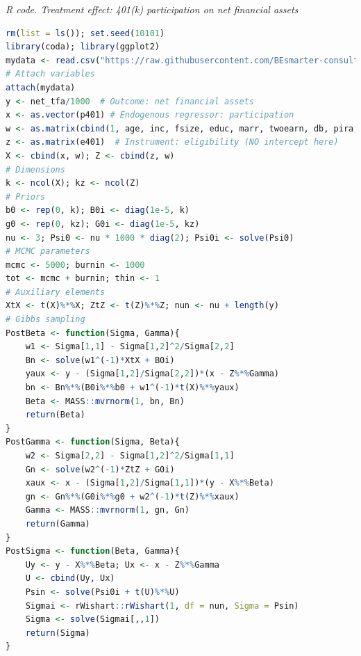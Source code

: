 \begin{tcolorbox}[enhanced,width=4.67in,center upper,
	fontupper=\large\bfseries,drop shadow southwest,sharp corners]\label{code3n_chap12}
	\textit{R code. Treatment effect: 401(k) participation on net financial assets}
	\begin{VF}
		\begin{lstlisting}[language=R]		
rm(list = ls()); set.seed(10101)
library(coda); library(ggplot2)
mydata <- read.csv("https://raw.githubusercontent.com/BEsmarter-consultancy/BSTApp/refs/heads/master/DataApp/401k.csv", sep = ",", header = TRUE, quote = "")
# Attach variables
attach(mydata)
y <- net_tfa/1000  # Outcome: net financial assets
x <- as.vector(p401) # Endogenous regressor: participation
w <- as.matrix(cbind(1, age, inc, fsize, educ, marr, twoearn, db, pira, hown))  # Exogenous regressors with intercept
z <- as.matrix(e401)  # Instrument: eligibility (NO intercept here)
X <- cbind(x, w); Z <- cbind(z, w)
# Dimensions
k <- ncol(X); kz <- ncol(Z)  
# Priors
b0 <- rep(0, k); B0i <- diag(1e-5, k)
g0 <- rep(0, kz); G0i <- diag(1e-5, kz)
nu <- 3; Psi0 <- nu * 1000 * diag(2); Psi0i <- solve(Psi0)
# MCMC parameters
mcmc <- 5000; burnin <- 1000
tot <- mcmc + burnin; thin <- 1
# Auxiliary elements
XtX <- t(X)%*%X; ZtZ <- t(Z)%*%Z; nun <- nu + length(y)
# Gibbs sampling
PostBeta <- function(Sigma, Gamma){
	w1 <- Sigma[1,1] - Sigma[1,2]^2/Sigma[2,2]
	Bn <- solve(w1^(-1)*XtX + B0i)
	yaux <- y - (Sigma[1,2]/Sigma[2,2])*(x - Z%*%Gamma)
	bn <- Bn%*%(B0i%*%b0 + w1^(-1)*t(X)%*%yaux)
	Beta <- MASS::mvrnorm(1, bn, Bn)
	return(Beta)
}
PostGamma <- function(Sigma, Beta){
	w2 <- Sigma[2,2] - Sigma[1,2]^2/Sigma[1,1]
	Gn <- solve(w2^(-1)*ZtZ + G0i)
	xaux <- x - (Sigma[1,2]/Sigma[1,1])*(y - X%*%Beta)
	gn <- Gn%*%(G0i%*%g0 + w2^(-1)*t(Z)%*%xaux)
	Gamma <- MASS::mvrnorm(1, gn, Gn)
	return(Gamma)
}
PostSigma <- function(Beta, Gamma){
	Uy <- y - X%*%Beta; Ux <- x - Z%*%Gamma
	U <- cbind(Uy, Ux)
	Psin <- solve(Psi0i + t(U)%*%U)
	Sigmai <- rWishart::rWishart(1, df = nun, Sigma = Psin)
	Sigma <- solve(Sigmai[,,1]) 
	return(Sigma)
}
	\end{lstlisting}
	\end{VF}
\end{tcolorbox} 


